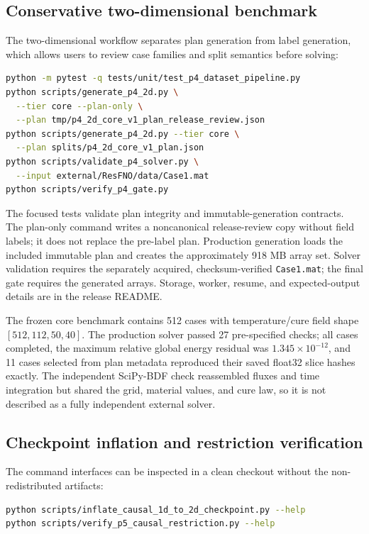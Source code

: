 \documentclass[preprint,12pt]{elsarticle}
\begin{document}
\subsection{Conservative two-dimensional benchmark}

The two-dimensional workflow separates plan generation from label generation,
which allows users to review case families and split semantics before solving:

\begin{lstlisting}[language=bash]
python -m pytest -q tests/unit/test_p4_dataset_pipeline.py
python scripts/generate_p4_2d.py \
  --tier core --plan-only \
  --plan tmp/p4_2d_core_v1_plan_release_review.json
python scripts/generate_p4_2d.py --tier core \
  --plan splits/p4_2d_core_v1_plan.json
python scripts/validate_p4_solver.py \
  --input external/ResFNO/data/Case1.mat
python scripts/verify_p4_gate.py
\end{lstlisting}

The focused tests validate plan integrity and immutable-generation contracts.
The plan-only command writes a noncanonical release-review copy without field
labels; it does not replace the pre-label plan. Production generation loads
the included immutable plan and creates the approximately 918 MB array set.
Solver validation requires the separately acquired, checksum-verified
\texttt{Case1.mat}; the final gate requires the generated arrays. Storage,
worker, resume, and expected-output details are in the release README.

The frozen core benchmark contains 512 cases with temperature/cure field shape
\([512,112,50,40]\). The production solver passed 27 pre-specified checks;
all cases completed, the maximum relative global energy residual was
\(1.345\times10^{-12}\), and 11 cases selected from plan metadata reproduced
their saved float32 slice hashes exactly. The independent SciPy-BDF check
reassembled fluxes and time integration but shared the grid, material values,
and cure law, so it is not described as a fully independent external solver.

\subsection{Checkpoint inflation and restriction verification}

The command interfaces can be inspected in a clean checkout without the
non-redistributed artifacts:

\begin{lstlisting}[language=bash]
python scripts/inflate_causal_1d_to_2d_checkpoint.py --help
python scripts/verify_p5_causal_restriction.py --help
\end{lstlisting}
\end{document}
